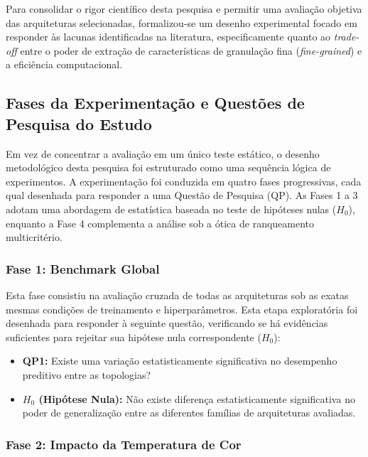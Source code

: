 
Para consolidar o rigor científico desta pesquisa e permitir uma avaliação objetiva das arquiteturas selecionadas, formalizou-se um desenho experimental focado em responder às lacunas identificadas na literatura, especificamente quanto ao \textit{trade-off} entre o poder de extração de características de granulação fina (\textit{fine-grained}) e a eficiência computacional.

\subsection{Fases da Experimentação e Questões de Pesquisa do Estudo}

    Em vez de concentrar a avaliação em um único teste estático, o desenho metodológico desta pesquisa foi estruturado como uma sequência lógica de experimentos. A experimentação foi conduzida em quatro fases progressivas, cada qual desenhada para responder a uma Questão de Pesquisa (QP). As Fases 1 a 3 adotam uma abordagem de estatística baseada no teste de hipóteses nulas ($H_{0}$), enquanto a Fase 4 complementa a análise sob a ótica de ranqueamento multicritério.

    \subsubsection{Fase 1: Benchmark Global}

        Esta fase consistiu na avaliação cruzada de todas as arquiteturas sob as exatas mesmas condições de treinamento e hiperparâmetros. Esta etapa exploratória foi desenhada para responder à seguinte questão, verificando se há evidências suficientes para rejeitar sua hipótese nula correspondente ($H_{0}$):

        \begin{itemize}
            \item\textbf{QP1:} Existe uma variação estatisticamente significativa no desempenho preditivo entre as topologias?
            \item\textbf{$H_{0}$ (Hipótese Nula):} Não existe diferença estatisticamente significativa no poder de generalização entre as diferentes famílias de arquiteturas avaliadas.
        \end{itemize}

    \subsubsection{Fase 2: Impacto da Temperatura de Cor}

